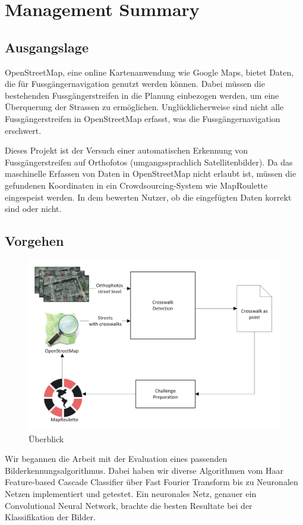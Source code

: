 \section{Management Summary}
\subsection*{Ausgangslage}
OpenStreetMap, eine online Kartenanwendung wie Google Maps, bietet Daten, die für Fussgängernavigation genutzt werden können. Dabei müssen die bestehenden Fussgängerstreifen in die Planung einbezogen werden, um eine Überquerung der Strassen zu ermöglichen. Unglücklicherweise sind nicht alle Fussgängerstreifen in OpenStreetMap erfasst, was die Fussgängernavigation erschwert.

Dieses Projekt ist der Versuch einer automatischen Erkennung von Fussgängerstreifen auf Orthofotos (umgangssprachlich Satellitenbilder). Da das maschinelle Erfassen von Daten in OpenStreetMap nicht erlaubt ist, müssen die gefundenen Koordinaten in ein Crowdsourcing-System wie MapRoulette eingespeist werden. In dem bewerten Nutzer, ob die eingefügten Daten korrekt sind oder nicht.

\subsection*{Vorgehen}
\begin{figure}[H]
	\centering
	\includegraphics[width=410pt]{images/management_summary_1.png}
	\caption[Management Summery Überblick]{Überblick}
\end{figure}
Wir begannen die Arbeit mit der Evaluation eines passenden Bilderkennungsalgorithmus. Dabei haben wir diverse Algorithmen vom Haar Feature-based Cascade Classifier über Fast Fourier Transform bis zu Neuronalen Netzen implementiert und getestet. Ein neuronales Netz, genauer ein Convolutional Neural Network, brachte die besten Resultate bei der Klassifikation der Bilder.

